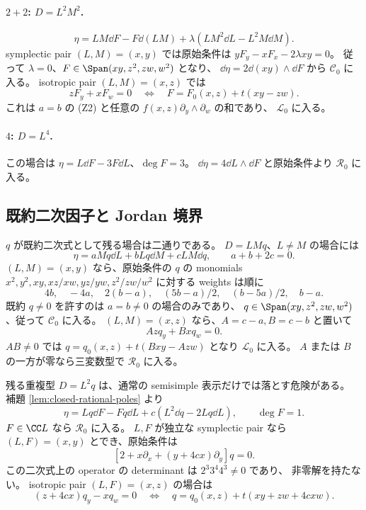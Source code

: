 \paragraph{$2+2$: $D=L^2M^2$.}
\[
 \eta=LM\dd F-F\dd(LM)+\lambda(LM^2\dd L-L^2M\dd M).
\]
symplectic pair $(L,M)=(x,y)$ では原始条件は
$yF_y-xF_x-2\lambda xy=0$。
従って $\lambda=0$、$F\in\Span(xy,z^2,zw,w^2)$ となり、
$\dd\eta=2\dd(xy)\wedge\dd F$ から $\mathcal C_0$ に入る。
isotropic pair $(L,M)=(x,z)$ では
\[
 zF_y+xF_w=0\quad\Longleftrightarrow\quad
 F=F_0(x,z)+t(xy-zw).
\]
これは $a=b$ の (Z2) と任意の $f(x,z)\partial_y\wedge\partial_w$ の和であり、
$\mathcal L_0$ に入る。

\paragraph{$4$: $D=L^4$.}
この場合は $\eta=L\dd F-3F\dd L$、$\deg F=3$。
$\dd\eta=4\dd L\wedge\dd F$ と原始条件より $\mathcal R_0$ に入る。

\subsection{既約二次因子と Jordan 境界}

$q$ が既約二次式として残る場合は二通りである。
$D=LMq$、$L\ne M$ の場合には
\[
 \eta=aMq\dd L+bLq\dd M+cLM\dd q,\qquad a+b+2c=0.
\]
$(L,M)=(x,y)$ なら、原始条件の $q$ の monomials
$x^2,y^2,xy,xz/xw,yz/yw,z^2/zw/w^2$ に対する weights は順に
\[
 4b,\quad -4a,\quad 2(b-a),\quad (5b-a)/2,\quad (b-5a)/2,\quad b-a.
\]
既約 $q\ne0$ を許すのは $a=b\ne0$ の場合のみであり、
$q\in\Span(xy,z^2,zw,w^2)$、従って $\mathcal C_0$ に入る。
$(L,M)=(x,z)$ なら、$A=c-a,B=c-b$ と置いて
\[
 Azq_y+Bxq_w=0.
\]
$AB\ne0$ では $q=q_0(x,z)+t(Bxy-Azw)$ となり $\mathcal L_0$ に入る。
$A$ または $B$ の一方が零なら三変数型で $\mathcal R_0$ に入る。

残る重複型 $D=L^2q$ は、通常の semisimple 表示だけでは落とす危険がある。
補題 \ref{lem:closed-rational-poles} より
\[
 \eta=Lq\dd F-Fq\dd L+c(L^2\dd q-2Lq\dd L),\qquad \deg F=1.
 \tag{Z7}\label{eq:double-linear-form}
\]
$F\in\CC L$ なら $\mathcal R_0$ に入る。
$L,F$ が独立な symplectic pair なら $(L,F)=(x,y)$ とでき、原始条件は
\[
 [2+x\partial_x+(y+4cx)\partial_y]q=0.
\]
この二次式上の operator の determinant は $2^3 3^4 4^3\ne0$ であり、
非零解を持たない。
isotropic pair $(L,F)=(x,z)$ の場合は
\[
 (z+4cx)q_y-xq_w=0\quad\Longleftrightarrow\quad
 q=q_0(x,z)+t(xy+zw+4cxw).                                 \tag{Z8}
\]

